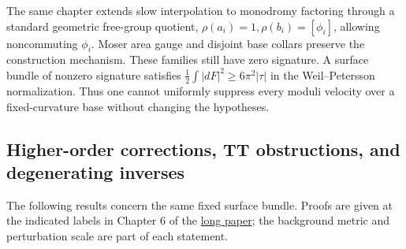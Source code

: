 \documentclass[a4paper,11pt]{article}
\numberwithin{equation}{section}
\theoremstyle{definition}
\begin{document}
The same chapter extends slow interpolation to monodromy factoring through a standard geometric free-group quotient,
$\rho(a_i)=1,\rho(b_i)=[\phi_i]$, allowing noncommuting $\phi_i$.
Moser area gauge and disjoint base collars preserve the construction mechanism.
These families still have zero signature. A surface bundle of nonzero signature satisfies
$\frac12\int|dF|^2\ge6\pi^2|\tau|$ in the Weil--Petersson normalization. Thus one cannot uniformly suppress every moduli velocity over a fixed-curvature base without changing the hypotheses.

\subsection{Higher-order corrections, TT obstructions, and degenerating inverses}
The following results concern the same fixed surface bundle.
Proofs are given at the indicated labels in Chapter 6 of the \href{20260912.tex}{long paper}; the background metric and perturbation scale are part of each statement.
\end{document}
